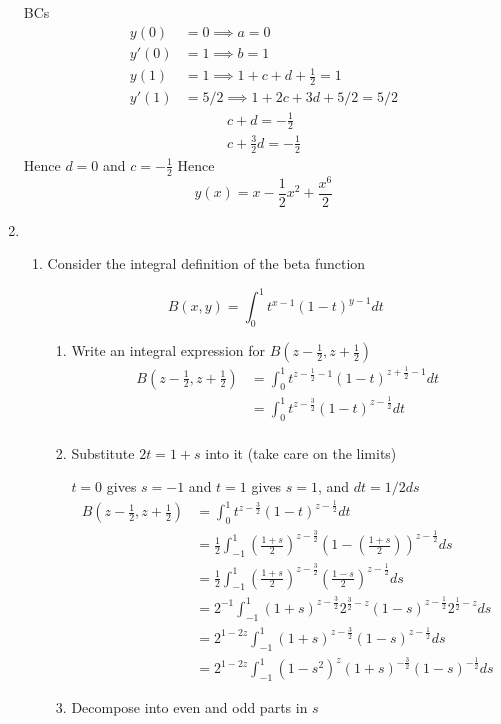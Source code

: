 \documentclass{X:/Documents/Coding/Latex/myassignment}
\begin{document}
\begin{enumerate}
BCs
\begin{align*}
	y(0) &= 0 \implies a = 0\\
	y'(0) &= 1 \implies b=1\\
	y(1) &= 1 \implies 1 + c + d + \frac12 = 1\\
	y'(1) &= 5/2 \implies 1 + 2c + 3d + 5/2 = 5/2
\end{align*}
\begin{align*}
	c + d = - \frac12\\
	c + \frac32 d = -\frac12
\end{align*}
Hence $d = 0$ and $ c = -\frac12$
Hence
\[\boxed { y(x) = x - \frac12 x^2 + \frac{x^6}{2} }\]

\item 
\begin{enumerate}
	\item Consider the integral definition of the beta function
	
	\begin{equation}
		B(x,y) = \int_0^1 t^{x-1} (1-t)^{y-1} dt	
		\label{betafunc}
	\end{equation}
	\begin{enumerate}
	 	\item Write an integral expression for $B(z-\frac12, z+ \frac12)$
	 	\begin{align*}
	 		B(z-\frac12,z+\frac12) &= \int_0^1 t^{z-\frac12-1} (1-t)^{z+\frac12-1} dt\\
	 		&=\int_0^1 t^{z-\frac32} (1-t)^{z-\frac12} dt\\
	 	\end{align*}
	 	\item Substitute $2t = 1+s$ into it (take care on the limits)
	 	
	 	$t = 0$ gives $s = -1$ and $t = 1$ gives $s =1$, and $dt = 1/2 ds$
	 	\begin{align*}
	 		B(z-\frac12,z+\frac12)&=\int_0^1 t^{z-\frac32} (1-t)^{z-\frac12} dt\\
	 		&= \frac12 \int_{-1}^{1} \left(\frac{1+s}{2}\right)^{z-\frac32} \left(1 - \left(\frac{1+s}{2}\right)\right)^{z-\frac12} ds\\
	 		&= \frac12 \int_{-1}^{1} \left(\frac{1+s}{2}\right)^{z-\frac32} \left(\frac{1-s}{2}\right)^{z-\frac12} ds\\
	 		&= 2^{-1}\int_{-1}^{1} \left(1+s\right)^{z-\frac32} 2^{\frac32 - z} \left(1-s\right)^{z-\frac12} 2^{\frac12 - z} ds\\
	 		&= 2^{1-2z} \int_{-1}^{1} \left(1+s\right)^{z-\frac32} \left(1-s\right)^{z-\frac12} ds\\
	 		&= 2^{1-2z} \int_{-1}^{1} \left(1-s^2\right)^z  \left(1+s\right)^{-\frac32}\left(1-s\right)^{-\frac12} ds
	 	\end{align*}
	 	\item Decompose into even and odd parts in $s$


\end{enumerate}
\end{enumerate}
\end{enumerate}
\end{document}
